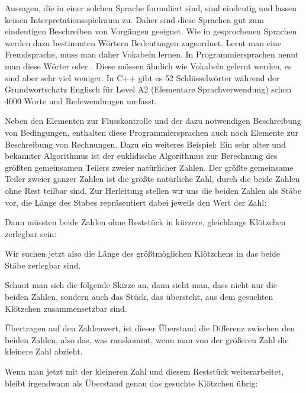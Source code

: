 Aussagen, die in einer solchen Sprache formuliert sind, sind eindeutig und lassen keinen Interpretationsspielraum zu. Daher sind diese Sprachen gut zum 
eindeutigen Beschreiben von Vorgängen geeignet. 
Wie in gesprochenen Sprachen werden dazu bestimmten Wörtern Bedeutungen zugeordnet. Lernt man eine Fremdsprache, muss man daher Vokabeln lernen. In Programmiersprachen nennt man diese Wörter  oder . Diese müssen ähnlich wie Vokabeln gelernt werden, es sind aber sehr viel weniger. In C++ gibt es 52 Schlüsselwörter während der Grundwortschatz Englisch für Level A2 (Elementare Sprachverwendung) schon 4000 Worte und Redewendungen umfasst.

Neben den Elementen zur Flusskontrolle und der dazu notwendigen Beschreibung von Bedingungen, enthalten diese Programmiersprachen auch noch Elemente zur
Beschreibung von Rechnungen. Dazu ein weiteres Beispiel: Ein sehr alter und bekannter Algorithmus ist der euklidische Algorithmus zur Berechnung des größten
gemeinsamen Teilers zweier natürlicher Zahlen. Der größte gemeinsame Teiler zweier ganzer Zahlen ist die größte natürliche Zahl, durch die beide Zahlen ohne Rest teilbar sind.
Zur Herleitung stellen wir uns die beiden Zahlen als Stäbe vor, die Länge des Stabes repräsentiert dabei jeweils den Wert der Zahl:


\vfill\null\pagebreak
Dann müssten beide Zahlen ohne Reststück in kürzere, gleichlange Klötzchen zerlegbar sein:


Wir suchen jetzt also die Länge des größtmöglichen Klötzchens in das beide Stäbe zerlegbar sind.

Schaut man sich die folgende Skizze an, dann sieht man, dass nicht nur die beiden Zahlen, sondern auch das Stück, 
das übersteht, aus dem gesuchten Klötzchen zusammensetzbar sind.


Übertragen auf den Zahlenwert, ist dieser Überstand die Differenz zwischen den beiden Zahlen, also das, was rauskommt, wenn man von der größeren Zahl die 
kleinere Zahl abzieht.


Wenn man jetzt mit der kleineren Zahl und diesem Reststück weiterarbeitet, bleibt irgendwann als Überstand genau das gesuchte Klötzchen übrig:

